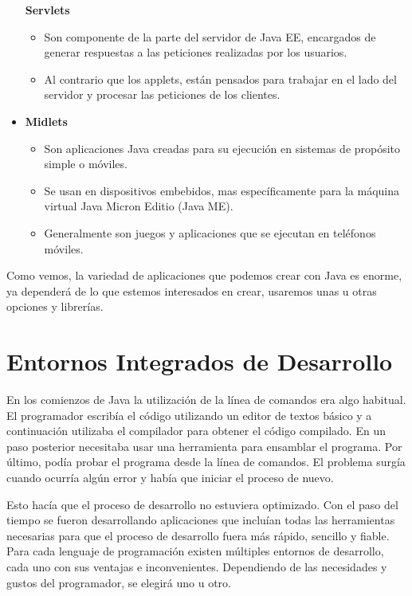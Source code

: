 \begin{itemize}
    \textbf{Servlets}
    \begin{itemize}
        \item Son componente de la parte del servidor de Java EE, encargados de generar respuestas a las peticiones realizadas por los usuarios.
        \item Al contrario que los applets, están pensados para trabajar en el lado del servidor y procesar las peticiones de los clientes.
    \end{itemize}

    \item \textbf{Midlets}
    \begin{itemize}
        \item Son aplicaciones Java creadas para su ejecución en sistemas de propósito simple o móviles.
        \item Se usan en dispositivos embebidos, mas específicamente para la máquina virtual Java Micron Editio (Java ME).
        \item Generalmente son juegos y aplicaciones que se ejecutan en teléfonos móviles.
    \end{itemize}
\end{itemize}

Como vemos, la variedad de aplicaciones que podemos crear con Java es enorme, ya dependerá de lo que estemos interesados en crear, usaremos unas u otras opciones y librerías.

\section{Entornos Integrados de Desarrollo}
En los comienzos de Java la utilización de la línea de comandos era algo habitual. El programador escribía el código utilizando un editor de textos básico y a continuación utilizaba el compilador para obtener el código compilado. En un paso posterior necesitaba usar una herramienta para ensamblar el programa. Por último, podía probar el programa desde la línea de comandos. El problema surgía cuando ocurría algún error y había que iniciar el proceso de nuevo.

Esto hacía que el proceso de desarrollo no estuviera optimizado. Con el paso del tiempo se fueron desarrollando aplicaciones que incluían todas las herramientas necesarias para que el proceso de desarrollo fuera más rápido, sencillo y fiable. Para cada lenguaje de programación existen múltiples entornos de desarrollo, cada uno con sus ventajas e inconvenientes. Dependiendo de las necesidades y gustos del programador, se elegirá uno u otro.


